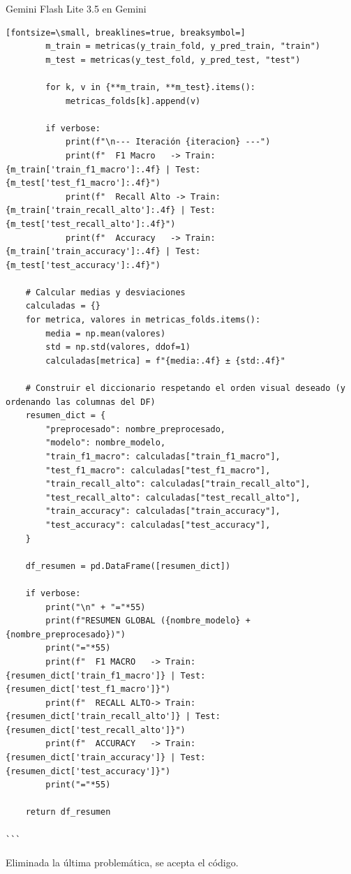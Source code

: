 \documentclass[12pt,a4paper,oneside]{book}
\begin{document}
\begin{iaresp}{Gemini Flash Lite 3.5 en Gemini}
\begin{Verbatim}[fontsize=\small, breaklines=true, breaksymbol=]
        m_train = metricas(y_train_fold, y_pred_train, "train")
        m_test = metricas(y_test_fold, y_pred_test, "test")
        
        for k, v in {**m_train, **m_test}.items():
            metricas_folds[k].append(v)
            
        if verbose:
            print(f"\n--- Iteración {iteracion} ---")
            print(f"  F1 Macro   -> Train: {m_train['train_f1_macro']:.4f} | Test: {m_test['test_f1_macro']:.4f}")
            print(f"  Recall Alto -> Train: {m_train['train_recall_alto']:.4f} | Test: {m_test['test_recall_alto']:.4f}")
            print(f"  Accuracy   -> Train: {m_train['train_accuracy']:.4f} | Test: {m_test['test_accuracy']:.4f}")
            
    # Calcular medias y desviaciones
    calculadas = {}
    for metrica, valores in metricas_folds.items():
        media = np.mean(valores)
        std = np.std(valores, ddof=1)
        calculadas[metrica] = f"{media:.4f} ± {std:.4f}"

    # Construir el diccionario respetando el orden visual deseado (y ordenando las columnas del DF)
    resumen_dict = {
        "preprocesado": nombre_preprocesado,
        "modelo": nombre_modelo,
        "train_f1_macro": calculadas["train_f1_macro"],
        "test_f1_macro": calculadas["test_f1_macro"],
        "train_recall_alto": calculadas["train_recall_alto"],
        "test_recall_alto": calculadas["test_recall_alto"],
        "train_accuracy": calculadas["train_accuracy"],
        "test_accuracy": calculadas["test_accuracy"],
    }

    df_resumen = pd.DataFrame([resumen_dict])
    
    if verbose:
        print("\n" + "="*55)
        print(f"RESUMEN GLOBAL ({nombre_modelo} + {nombre_preprocesado})")
        print("="*55)
        print(f"  F1 MACRO   -> Train: {resumen_dict['train_f1_macro']} | Test: {resumen_dict['test_f1_macro']}")
        print(f"  RECALL ALTO-> Train: {resumen_dict['train_recall_alto']} | Test: {resumen_dict['test_recall_alto']}")
        print(f"  ACCURACY   -> Train: {resumen_dict['train_accuracy']} | Test: {resumen_dict['test_accuracy']}")
        print("="*55)
        
    return df_resumen

```
\end{Verbatim}
\end{iaresp}
\begin{iaanalisis}
Eliminada la última problemática, se acepta el código.
\end{iaanalisis}
\end{document}
